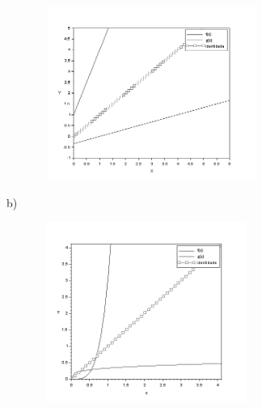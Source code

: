 \documentclass[12pt]{article}
\begin{document}
\begin{enumerate}

\begin{figure}[H]
	\begin{Center}
		\includegraphics[width=2.91in,height=2.23in]{./media/image13.png}
	\end{Center}
\end{figure}



\par


\vspace{\baselineskip}

\vspace{\baselineskip}

\vspace{\baselineskip}

\vspace{\baselineskip}
b)\par




\begin{figure}[H]
	\begin{Center}
		\includegraphics[width=2.77in,height=2.31in]{./media/image14.png}
	\end{Center}
\end{figure}



\end{enumerate}
\end{document}
